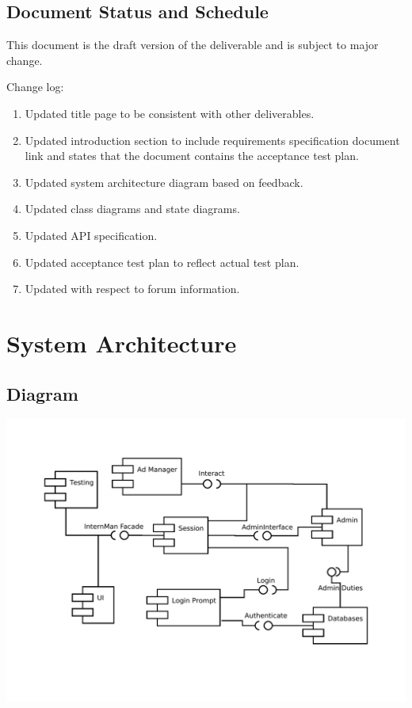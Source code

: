 \documentclass[11pt]{l3deliverable}
\begin{document}
\subsection{Document Status and Schedule}

This document is the draft version of the deliverable and is subject to major
change.

Change log:

\begin{enumerate}
\item Updated title page to be consistent with other deliverables.
\item Updated introduction section to include requirements specification document
link and states that the document contains the acceptance test plan.
\item Updated system architecture diagram based on feedback.
\item Updated class diagrams and state diagrams.
\item Updated API specification.
\item Updated acceptance test plan to reflect actual test plan.
\item Updated with respect to forum information.
\end{enumerate}

\newpage

\section{System Architecture}

\subsection{Diagram}

\begin{centering}
  \includegraphics[width=\textwidth]{PSDDiagram.pdf}
\end{centering}
\end{document}
